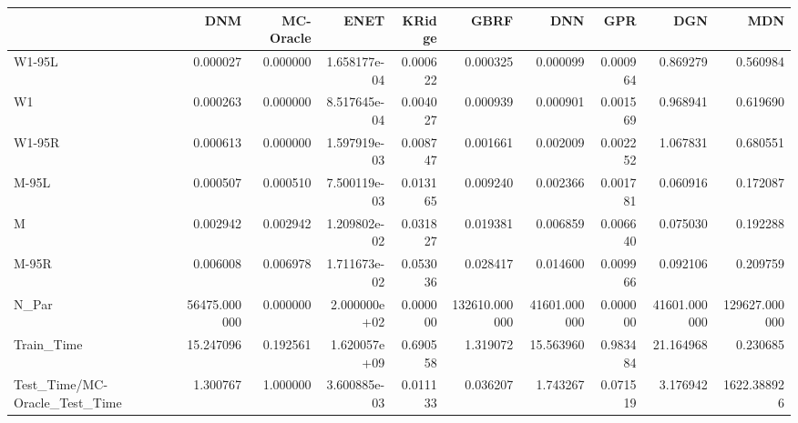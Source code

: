\begin{tabular}{lrrrrrrrrr}
\toprule
{} &           DNM &  MC-Oracle &          ENET &    KRidge &           GBRF &           DNN &       GPR &           DGN &            MDN \\
\midrule
W1-95L                        &      0.000027 &   0.000000 &  1.658177e-04 &  0.000622 &       0.000325 &      0.000099 &  0.000964 &      0.869279 &       0.560984 \\
W1                            &      0.000263 &   0.000000 &  8.517645e-04 &  0.004027 &       0.000939 &      0.000901 &  0.001569 &      0.968941 &       0.619690 \\
W1-95R                        &      0.000613 &   0.000000 &  1.597919e-03 &  0.008747 &       0.001661 &      0.002009 &  0.002252 &      1.067831 &       0.680551 \\
M-95L                         &      0.000507 &   0.000510 &  7.500119e-03 &  0.013165 &       0.009240 &      0.002366 &  0.001781 &      0.060916 &       0.172087 \\
M                             &      0.002942 &   0.002942 &  1.209802e-02 &  0.031827 &       0.019381 &      0.006859 &  0.006640 &      0.075030 &       0.192288 \\
M-95R                         &      0.006008 &   0.006978 &  1.711673e-02 &  0.053036 &       0.028417 &      0.014600 &  0.009966 &      0.092106 &       0.209759 \\
N\_Par                         &  56475.000000 &   0.000000 &  2.000000e+02 &  0.000000 &  132610.000000 &  41601.000000 &  0.000000 &  41601.000000 &  129627.000000 \\
Train\_Time                    &     15.247096 &   0.192561 &  1.620057e+09 &  0.690558 &       1.319072 &     15.563960 &  0.983484 &     21.164968 &       0.230685 \\
Test\_Time/MC-Oracle\_Test\_Time &      1.300767 &   1.000000 &  3.600885e-03 &  0.011133 &       0.036207 &      1.743267 &  0.071519 &      3.176942 &    1622.388926 \\
\bottomrule
\end{tabular}
